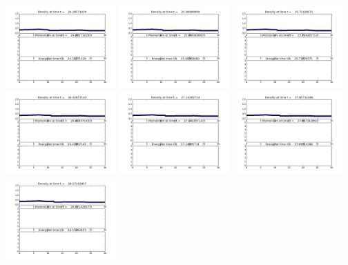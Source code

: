 \documentclass[11pt]{article}
\begin{document}
\vskip 10pt 
\includegraphics[width=0.316666666667\textwidth]{frame0034fig1.png}
\vskip 10pt 
\includegraphics[width=0.316666666667\textwidth]{frame0035fig1.png}
\vskip 10pt 
\includegraphics[width=0.316666666667\textwidth]{frame0036fig1.png}
\vskip 10pt 
\includegraphics[width=0.316666666667\textwidth]{frame0037fig1.png}
\vskip 10pt 
\includegraphics[width=0.316666666667\textwidth]{frame0038fig1.png}
\vskip 10pt 
\includegraphics[width=0.316666666667\textwidth]{frame0039fig1.png}
\vskip 10pt 
\includegraphics[width=0.316666666667\textwidth]{frame0040fig1.png}
\end{document}
